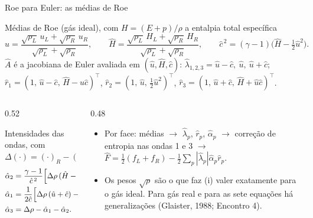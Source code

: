 \documentclass[aspectratio=169,10pt]{beamer}
\newcommand{\Fh}{\widehat F}
\newcommand{\Ah}{\widehat A}
\newcommand{\lh}{\hat\lambda}
\newcommand{\ah}{\hat\alpha}
\newcommand{\rh}{\hat r}
\begin{document}
\begin{frame}{Roe para Euler: as médias de Roe}
\begin{definicao}{Médias de Roe (gás ideal), com $H=(E+p)/\rho$ a entalpia total específica}
\[
\hat u=\frac{\sqrt{\rho_L}\,u_L+\sqrt{\rho_R}\,u_R}{\sqrt{\rho_L}+\sqrt{\rho_R}},\qquad
\hat H=\frac{\sqrt{\rho_L}\,H_L+\sqrt{\rho_R}\,H_R}{\sqrt{\rho_L}+\sqrt{\rho_R}},\qquad
\hat c^{\,2}=(\gamma-1)\Big(\hat H-\tfrac12\hat u^2\Big).
\]
$\Ah$ é a jacobiana de Euler avaliada em $(\hat u,\hat H,\hat c)$: $\lh_{1,2,3}=\hat u-\hat c,\ \hat u,\ \hat u+\hat c$;\ \
$\rh_1=(1,\,\hat u-\hat c,\,\hat H-\hat u\hat c)^{\!\top}$, $\rh_2=(1,\,\hat u,\,\tfrac12\hat u^2)^{\!\top}$, $\rh_3=(1,\,\hat u+\hat c,\,\hat H+\hat u\hat c)^{\!\top}$.
\end{definicao}
\begin{columns}[T]
\begin{column}{0.52\textwidth}
\begin{teorema}{Intensidades das ondas, com $\Delta(\cdot)=(\cdot)_R-(\cdot)_L$}
\vspace{-0.3cm}
\[
{\small\begin{aligned}
\ah_2&=\frac{\gamma-1}{\hat c^{\,2}}\Big[\Delta\rho\,(\hat H-\hat u^2)+\hat u\,\Delta(\rho u)-\Delta E\Big],\\
\ah_1&=\frac{1}{2\hat c}\Big[\Delta\rho\,(\hat u+\hat c)-\Delta(\rho u)-\hat c\,\ah_2\Big],\\
\ah_3&=\Delta\rho-\ah_1-\ah_2 .
\end{aligned}}
\]
\end{teorema}
\end{column}
\begin{column}{0.48\textwidth}
\begin{itemize}
\item Por face: médias $\to$ $\lh_p$, $\rh_p$, $\ah_p$ $\to$ correção de entropia nas ondas 1 e 3 $\to$ $\Fh=\frac12(f_L+f_R)-\frac12\sum_p|\lh_p|\ah_p\rh_p$.
\item Os pesos $\sqrt\rho$ são o que faz (i) valer exatamente para o gás ideal. Para gás real e para as sete equações há generalizações (Glaister, 1988; Encontro 4).
\end{itemize}
\end{column}
\end{columns}
\end{frame}
\end{document}
